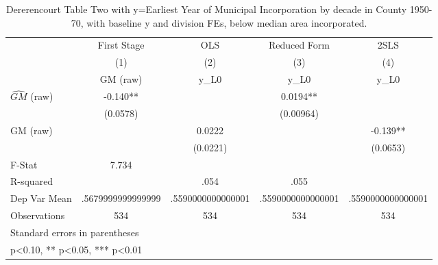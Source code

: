 \begin{table}[htbp]\centering
\def\sym#1{\ifmmode^{#1}\else\(^{#1}\)\fi}
\caption{Dererencourt Table Two with y=Earliest Year of Municipal Incorporation by decade in County 1950-70, with baseline y and division FEs, below median area incorporated.}
\begin{tabular}{l*{4}{c}}
\toprule
                    & First Stage   &         OLS   &Reduced Form   &        2SLS   \\
                    &\multicolumn{1}{c}{(1)}&\multicolumn{1}{c}{(2)}&\multicolumn{1}{c}{(3)}&\multicolumn{1}{c}{(4)}\\
                    &\multicolumn{1}{c}{GM  (raw)}&\multicolumn{1}{c}{y\_L0}&\multicolumn{1}{c}{y\_L0}&\multicolumn{1}{c}{y\_L0}\\
\midrule
$\hat{GM}$ (raw)    &      -0.140** &               &      0.0194** &               \\
                    &    (0.0578)   &               &   (0.00964)   &               \\
\addlinespace
GM  (raw)           &               &      0.0222   &               &      -0.139** \\
                    &               &    (0.0221)   &               &    (0.0653)   \\
\midrule
F-Stat              &       7.734   &               &               &               \\
R-squared           &               &        .054   &        .055   &               \\
Dep Var Mean        &.5679999999999999   &.5590000000000001   &.5590000000000001   &.5590000000000001   \\
Observations        &         534   &         534   &         534   &         534   \\
\bottomrule
\multicolumn{5}{l}{\footnotesize Standard errors in parentheses}\\
\multicolumn{5}{l}{\footnotesize * p<0.10, ** p<0.05, *** p<0.01}\\
\end{tabular}
\end{table}
